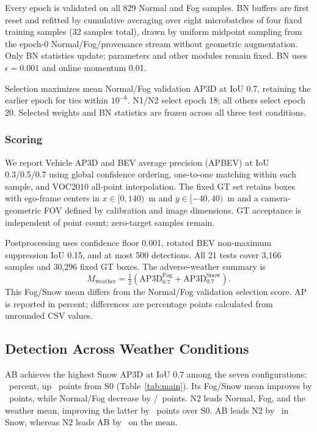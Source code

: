 Every epoch is validated on all 829 Normal and Fog samples. BN buffers are first reset and refitted by cumulative averaging over eight microbatches of four fixed training samples (32 samples total), drawn by uniform midpoint sampling from the epoch-0 Normal/Fog/provenance stream without geometric augmentation. Only BN statistics update; parameters and other modules remain fixed. BN uses $\epsilon=0.001$ and online momentum 0.01.

Selection maximizes mean Normal/Fog validation AP3D at IoU 0.7, retaining the earlier epoch for ties within $10^{-6}$. N1/N2 select epoch 18; all others select epoch 20. Selected weights and BN statistics are frozen across all three test conditions.

\subsubsection{Scoring}
We report Vehicle AP3D and BEV average precision (APBEV) at IoU 0.3/0.5/0.7 using global confidence ordering, one-to-one matching within each sample, and VOC2010 all-point interpolation. The fixed GT set retains boxes with ego-frame centers in $x\in[0,140)$~m and $y\in[-40,40)$~m and a camera-geometric FOV defined by calibration and image dimensions. GT acceptance is independent of point count; zero-target samples remain.

Postprocessing uses confidence floor 0.001, rotated BEV non-maximum suppression IoU 0.15, and at most 500 detections. All 21 tests cover 3,166 samples and 30,296 fixed GT boxes. The adverse-weather summary is
\begin{equation}
M_{\mathrm{weather}}=\tfrac12\left(\mathrm{AP3D}^{\mathrm{Fog}}_{0.7}+\mathrm{AP3D}^{\mathrm{Snow}}_{0.7}\right). \label{eq:weather}
\end{equation}
This Fog/Snow mean differs from the Normal/Fog validation selection score. AP is reported in percent; differences are percentage points calculated from unrounded CSV values.

\subsection{Detection Across Weather Conditions}
AB achieves the highest Snow AP3D at IoU 0.7 among the seven configurations: \ABSsnow\ percent, up \ABSnowGain\ points from S0 (Table~\ref{tab:main}). Its Fog/Snow mean improves by \ABMeanGain\ points, while Normal/Fog decrease by \ABNormalLoss/\ABFogLoss\ points. N2 leads Normal, Fog, and the weather mean, improving the latter by \PriorGain\ points over S0. AB leads N2 by \ABPriorSnowGain\ in Snow, whereas N2 leads AB by \ABPriorMeanLoss\ on the mean.

